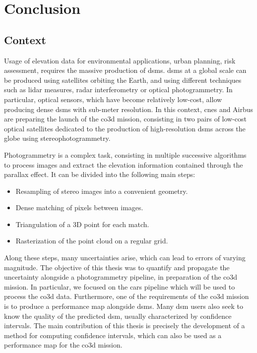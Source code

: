 \chapter*{Conclusion}
\section*{Context}
Usage of elevation data for environmental applications, urban planning, risk assessment, \etc requires the massive production of \acrfull{dsm}s. \acrshort{dsm}s at a global scale can be produced using satellites orbiting the Earth, and using different techniques such as \acrshort{lidar} measures, radar interferometry or optical photogrammetry. In particular, optical sensors, which have become relatively low-cost, allow producing dense \acrshort{dsm}s with sub-meter resolution. In this context, \acrshort{cnes} and Airbus are preparing the launch of the \acrshort{co3d} mission, consisting in two pairs of low-cost optical satellites dedicated to the production of high-resolution \acrshort{dsm}s across the globe using stereophotogrammetry.

Photogrammetry is a complex task, consisting in multiple successive algorithms to process images and extract the elevation information contained through the parallax effect. It can be divided into the following main steps:
\begin{itemize}
    \item Resampling of stereo images into a convenient geometry.
    \item Dense matching of pixels between images.
    \item Triangulation of a 3D point for each match.
    \item Rasterization of the point cloud on a regular grid.
\end{itemize}
Along these steps, many uncertainties arise, which can lead to errors of varying magnitude. The objective of this thesis was to quantify and propagate the uncertainty alongside a photogrammetry pipeline, in preparation of the \acrshort{co3d} mission. In particular, we focused on the \acrshort{cars} pipeline which will be used to process the \acrshort{co3d} data. Furthermore, one of the requirements of the \acrshort{co3d} mission is to produce a performance map alongside \acrshort{dsm}s. Many \acrshort{dsm} users also seek to know the quality of the predicted \acrshort{dsm}, usually characterized by confidence intervals. The main contribution of this thesis is precisely the development of a method for computing confidence intervals, which can also be used as a performance map for the \acrshort{co3d} mission.

